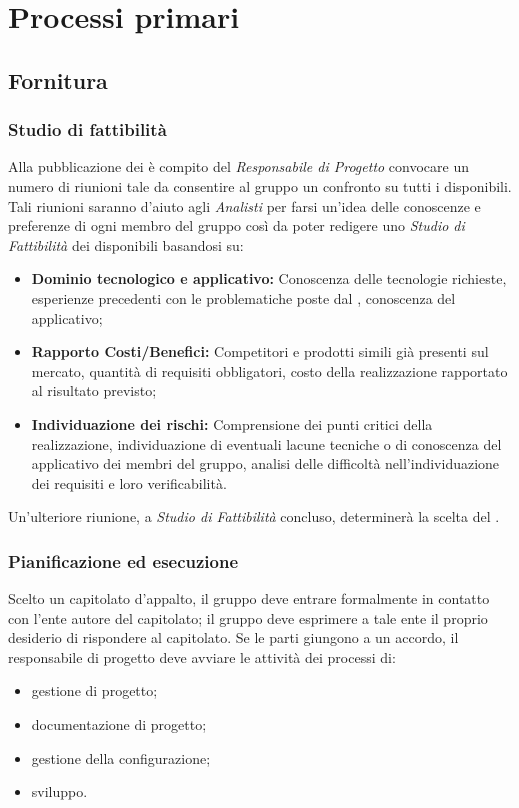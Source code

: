 \section{Processi primari}
	\subsection{Fornitura}
		\subsubsection{Studio di fattibilità}
		Alla pubblicazione dei  è compito del \emph{Responsabile di Progetto} convocare un numero di riunioni tale da consentire
    al gruppo un confronto su tutti i  disponibili.\\
    Tali riunioni saranno d'aiuto agli \emph{Analisti} per farsi un'idea delle conoscenze e preferenze di ogni membro del gruppo così da
    poter redigere uno \emph{Studio di Fattibilità} dei  disponibili basandosi su:\\
    \begin{itemize}
      \item \textbf{Dominio tecnologico e applicativo: }Conoscenza delle tecnologie richieste, esperienze precedenti con le problematiche poste dal , conoscenza del
       applicativo;
      \item \textbf{Rapporto Costi/Benefici: }Competitori e prodotti simili già presenti sul mercato, quantità di requisiti obbligatori, costo della realizzazione rapportato al
      risultato previsto;
      \item \textbf{Individuazione dei rischi: }Comprensione dei punti critici della realizzazione, individuazione di eventuali lacune tecniche o di conoscenza del  applicativo
      dei membri del gruppo, analisi delle difficoltà nell’individuazione dei requisiti e loro verificabilità.
    \end{itemize}
    Un'ulteriore riunione, a \emph{Studio di Fattibilità} concluso, determinerà la scelta del .
    \subsubsection{Pianificazione ed esecuzione}
    Scelto un capitolato d’appalto, il gruppo deve entrare formalmente in contatto con l’ente autore del capitolato; il gruppo deve esprimere a tale ente il proprio desiderio di rispondere al capitolato. Se le parti giungono a un accordo, il responsabile di progetto deve avviare le attività dei processi di:
    \begin{itemize}
    	\item gestione di progetto;
    	\item documentazione di progetto;
    	\item gestione della configurazione;
    	\item sviluppo.
    \end{itemize}
